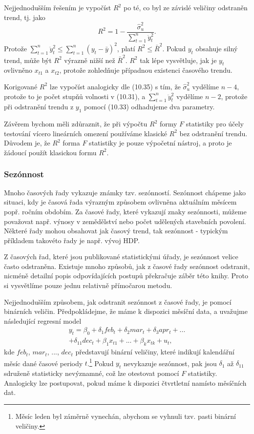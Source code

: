 Nejjednodušším řešením je vypočíst $R^2$ po té, co byl ze 
závislé veličiny odstraněn trend, tj. jako
\begin{equation}
R^2 = 1 - \frac{\hat{\sigma}^2_u}{\sum_{t = 1}^n \ddot{y}_t^2}.
\end{equation}
Protože $\sum_{t = 1}^n \ddot{y}_t^2 \le \sum_{t = 1}^n (y_t - 
\bar{y})^2$, platí $R^2 \le \bar{R}^2$. Pokud $y_t$ obsahuje silný 
trend, může být $R^2$ výrazně nižší než $\bar{R}^2$. $R^2$ tak
lépe vysvětluje, jak je $y_t$ ovlivněno $x_{t1}$ a $x_{t2}$, 
protože zohledňuje případnou existenci časového trendu.

Korigované $R^2$ lze vypočíst analogicky dle (10.35) s tím, že 
$\hat{\sigma}^2_u$ vydělíme $n - 4$, protože to je počet stupňů 
volnosti v (10.31), a $\sum_{t = 1}^n \ddot{y}_t^2$ vydělíme $n - 2$, 
protože při odstranění trendu z $y_1$ pomocí (10.33) odhadujeme dva parametry.

Závěrem bychom měli zdůraznit, že při výpočtu $R^2$ formy $F$ statistiky pro účely testování vícero 
lineárních omezení používáme klasické $R^2$ bez odstranění 
trendu. Důvodem je, že $R^2$ forma $F$ statistiky je pouze 
výpočetní nástroj, a proto je žádoucí použít klasickou formu $R^2$.

\subsubsection{Sezónnost}

Mnoho časových řady vykazuje známky tzv. sezónností. Sezónnost chápeme 
jako situaci, kdy je časová řada výrazným způsobem 
ovlivněna aktuálním měsícem popř. ročním obdobím. Za časové 
řady, které vykazují znaky sezónnosti, můžeme považovat např. 
výnosy v zemědělství nebo počet udělených stavebních povolení. 
Některé řady mohou obsahovat jak časový trend, tak sezónnost - 
typickým příkladem takovéto řady je např. vývoj HDP.

Z časových řad, které jsou publikované statistickými úřady, je 
sezónnost velice často odstraněna. Existuje mnoho způsobů, jak z 
časové řady sezónnost odstranit, nicméně detailní popis odpovídajících 
postupů překračuje záběr této knihy. Proto si vysvětlíme pouze 
jednu relativně přímočarou metodu.

Nejjednodušším způsobem, jak odstranit sezónnost z časové řady, je pomocí 
binárních veličin. Předpokládejme, že máme k dispozici 
měsíční data, a uvažujme následující regresní model
\begin{multline}
y_t = \beta_0 + \delta_1 feb_t + \delta_2 mar_t + \delta_3 apr_t + 
...\\ 
+ \delta_{11} dec_t + \beta_1 x_{t1} + ... + \beta_k x_{tk} + u_t,
\end{multline}
kde $feb_t$, $mar_t$, ..., $dec_t$ představují binární veličiny, 
které indikují kalendářní měsíc dané časové periody 
$t$.\footnote{Měsíc leden byl záměrně vynechán, abychom se 
vyhnuli tzv. pasti binární veličiny.} 
Pokud $y_t$ nevykazuje sezónnost, pak jsou $\delta_1$ až $\delta_{11}$ 
sdruženě statisticky nevýznamné, což lze otestovat pomocí $F$ 
statistiky. Analogicky lze postupovat, pokud máme k dispozici 
čtvrtletní namísto měsíčních dat.

